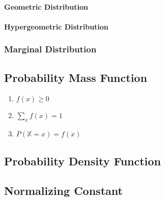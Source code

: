 \paragraph{Geometric Distribution}\label{sec:geometric_distribution}

\paragraph{Hypergeometric Distribution}
\label{sec:hypergeometric_distribution}



\subsubsection{Marginal Distribution}\label{sec:marginal_distribution}



\subsection{Probability Mass Function}\label{sec:probability_mass}

\begin{enumerate}
  \item $f(x) \geq 0$
  \item $\sum_x f(x) = 1$
  \item $P(\mathbb{X} = x) = f(x)$
\end{enumerate}



\subsection{Probability Density Function}\label{sec:probability_density}



\subsection{Normalizing Constant}\label{sec:normalizing_constant}



